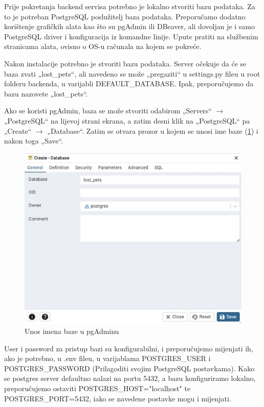 		Prije pokretanja backend servisa potrebno je lokalno stvoriti bazu podataka. Za to je potreban PostgreSQL poslužitelj baza podataka. Preporučamo dodatno korištenje grafičkih alata kao što su pgAdmin ili DBeaver, ali dovoljan je i samo PostgreSQL driver i konfiguracija iz komandne linije. Upute pratiti na službenim stranicama alata, ovisno o OS-u računala na kojem se pokreće.
		
		Nakon instalacije potrebno je stvoriti bazu podataka. Server očekuje da će se baza zvati „lost\_pets“, ali navedeno se može „pregaziti“ u settings.py fileu u root folderu backenda, u varijabli DEFAULT\_DATABASE. Ipak, preporučujemo da bazu nazovete „lost\_pets“.
		
		Ako se koristi pgAdmin, baza se može stvoriti odabirom „Servers“ $\rightarrow$ „PostgreSQL“ na lijevoj strani ekrana, a zatim desni klik na „PostgreSQL“ pa „Create“ $\rightarrow$ „Database“. Zatim se otvara prozor u kojem se unosi ime baze (\ref{fig:deploy1}) i nakon toga „Save“.
		
		\begin{figure}[H]
			\includegraphics[scale=0.65]{slike/deploy1.jpg} %
			\centering
			\caption{Unos imena baze u pgAdminu}
			\label{fig:deploy1}
		\end{figure}
		
		User i password za pristup bazi su konfigurabilni, i preporučujemo mijenjati ih, ako je potrebno, u .env fileu, u varijablama POSTGRES\_USER i POSTGRES\_PASSWORD (Prilagoditi svojim PostgreSQL postavkama). Kako se postgres server defaultno nalazi na portu 5432, a bazu konfiguriramo lokalno, preporučujemo ostaviti POSTGRES\_HOST="localhost" te POSTGRES\_PORT=5432, iako se navedene postavke mogu i mijenjati.
		
